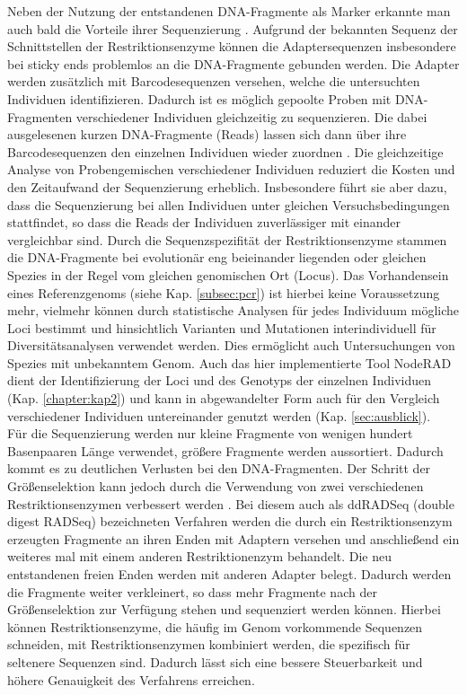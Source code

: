 Neben der Nutzung der entstandenen DNA-Fragmente als Marker erkannte man auch bald die Vorteile ihrer Sequenzierung \cite{baird_2008}. Aufgrund der bekannten Sequenz der Schnittstellen der Restriktionsenzyme können die Adaptersequenzen insbesondere bei sticky ends problemlos an die DNA-Fragmente gebunden werden. Die Adapter werden zusätzlich mit Barcodesequenzen versehen, welche die untersuchten Individuen identifizieren. Dadurch ist es möglich gepoolte Proben mit DNA-Fragmenten verschiedener Individuen gleichzeitig zu sequenzieren. Die dabei ausgelesenen kurzen DNA-Fragmente (Reads) lassen sich dann über ihre Barcodesequenzen den einzelnen Individuen wieder zuordnen \cite{davey_2010}. Die gleichzeitige Analyse von Probengemischen verschiedener Individuen reduziert die Kosten und den Zeitaufwand der Sequenzierung erheblich. Insbesondere führt sie aber dazu, dass die Sequenzierung bei allen Individuen unter gleichen Versuchsbedingungen stattfindet, so dass die Reads der Individuen zuverlässiger mit einander vergleichbar sind. Durch die Sequenzspezifität der Restriktionsenzyme stammen die DNA-Fragmente bei evolutionär eng beieinander liegenden oder gleichen Spezies in der Regel vom gleichen genomischen Ort (Locus). Das Vorhandensein eines Referenzgenoms (siehe Kap. \ref{subsec:pcr}) ist hierbei keine Voraussetzung mehr, vielmehr können durch statistische Analysen für jedes Individuum mögliche Loci bestimmt \cite{leggett_2014} und hinsichtlich Varianten und Mutationen interindividuell für Diversitätsanalysen verwendet werden. Dies ermöglicht auch Untersuchungen von Spezies mit unbekanntem Genom. Auch das hier implementierte Tool NodeRAD \cite{noderad} dient der Identifizierung der Loci und des Genotyps der einzelnen Individuen (Kap. \ref{chapter:kap2}) und kann in abgewandelter Form auch für den Vergleich verschiedener Individuen untereinander genutzt werden (Kap. \ref{sec:ausblick}).  \\

Für die Sequenzierung werden nur kleine Fragmente von wenigen hundert Basenpaaren Länge verwendet, größere Fragmente werden aussortiert. Dadurch kommt es zu deutlichen Verlusten bei den DNA-Fragmenten. Der Schritt der Größenselektion kann jedoch durch die Verwendung von zwei verschiedenen Restriktionsenzymen verbessert werden \cite{peterson_2012}. Bei diesem auch als ddRADSeq (double digest RADSeq) bezeichneten Verfahren werden die durch ein Restriktionsenzym erzeugten Fragmente an ihren Enden mit Adaptern versehen und anschließend ein weiteres mal mit einem anderen Restriktionenzym behandelt. Die neu entstandenen freien Enden werden mit anderen Adapter belegt. Dadurch werden die Fragmente weiter verkleinert, so dass mehr Fragmente nach der Größenselektion zur Verfügung stehen und sequenziert werden können. Hierbei können Restriktionsenzyme, die häufig im Genom vorkommende Sequenzen schneiden, mit Restriktionsenzymen kombiniert werden, die spezifisch für seltenere Sequenzen sind. Dadurch lässt sich eine bessere Steuerbarkeit und  höhere Genauigkeit des Verfahrens erreichen. \\

